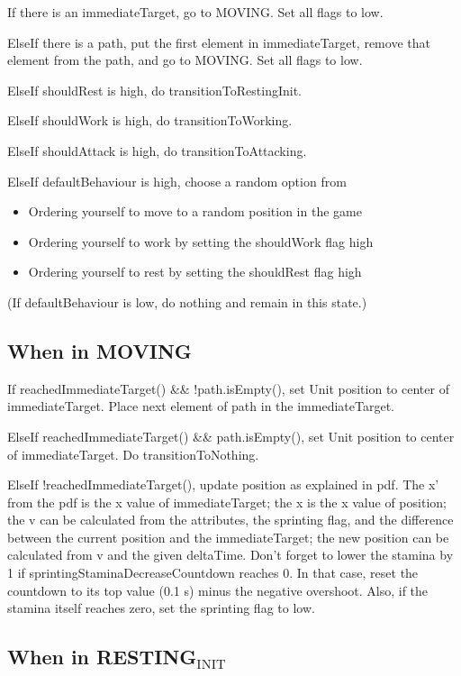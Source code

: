 \documentclass[11pt]{article}
\begin{document}
If there is an immediateTarget, go to MOVING. Set all flags to low.

ElseIf there is a path, put the first element in immediateTarget, remove that
element from the path, and go to MOVING. Set all flags to low.

ElseIf shouldRest is high, do transitionToRestingInit.

ElseIf shouldWork is high, do transitionToWorking.

ElseIf shouldAttack is high, do transitionToAttacking.

ElseIf defaultBehaviour is high, choose a random option from
\begin{itemize}
\item Ordering yourself to move to a random position in the game
\item Ordering yourself to work by setting the shouldWork flag high
\item Ordering yourself to rest by setting the shouldRest flag high
\end{itemize}

(If defaultBehaviour is low, do nothing and remain in this state.)


\subsection{When in MOVING}
\label{sec-2-2}

If reachedImmediateTarget() \&\& !path.isEmpty(), set Unit position to center of
immediateTarget. Place next element of path in the immediateTarget.

ElseIf reachedImmediateTarget() \&\& path.isEmpty(), set Unit position to center of
immediateTarget. Do transitionToNothing.

ElseIf !reachedImmediateTarget(), update position as explained in pdf. The x'
from the pdf is the x value of immediateTarget; the x is the x value of
position; the v can be calculated from the attributes, the sprinting flag, and
the difference between the current position and the immediateTarget; the new
position can be calculated from v and the given deltaTime. Don't forget to lower
the stamina by 1 if sprintingStaminaDecreaseCountdown reaches 0. In that case,
reset the countdown to its top value (0.1 s) minus the negative overshoot. Also,
if the stamina itself reaches zero, set the sprinting flag to low.


\subsection{When in RESTING$_{\text{INIT}}$}
\label{sec-2-3}
\end{document}
